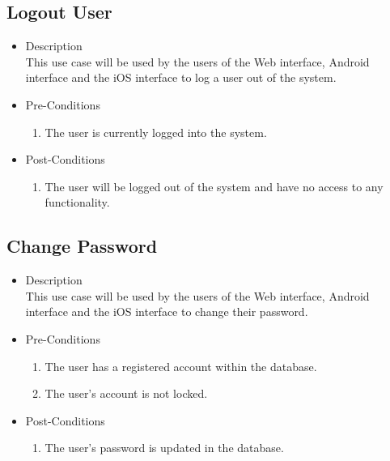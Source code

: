 \documentclass[11pt,fleqn]{book} %
\begin{document}
	\subsection{Logout User}
	\begin{itemize}
		\item Description\\
		This use case will be used by the users of the Web interface, Android interface and the iOS interface to log a user out of the system.
		\item Pre-Conditions
		\begin{enumerate}
			\item The user is currently logged into the system.
		\end{enumerate}
		\item Post-Conditions
		\begin{enumerate}
			\item The user will be logged out of the system and have no access to any functionality.
		\end{enumerate}
	\end{itemize}
	
	\subsection{Change Password}
	\begin{itemize}
		\item Description\\
		This use case will be used by the users of the Web interface, Android interface and the iOS interface to change their password.
		\item Pre-Conditions
		\begin{enumerate}
			\item The user has a registered account within the database.
			\item The user’s account is not locked.
		\end{enumerate}
		\item Post-Conditions
		\begin{enumerate}
			\item The user’s password is updated in the database. 
		\end{enumerate}
	\end{itemize}
	
\end{document}
